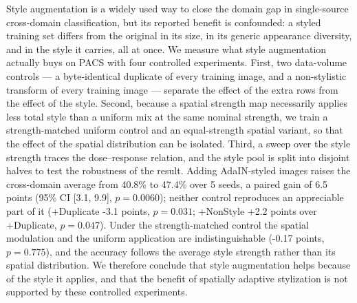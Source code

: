 Style augmentation is a widely used way to close the domain gap in single-source cross-domain classification, but its reported benefit is confounded: a styled training set differs from the original in its size, in its generic appearance diversity, and in the style it carries, all at once. We measure what style augmentation actually buys on PACS with four controlled experiments. First, two data-volume controls --- a byte-identical duplicate of every training image, and a non-stylistic transform of every training image --- separate the effect of the extra rows from the effect of the style. Second, because a spatial strength map necessarily applies less total style than a uniform mix at the same nominal strength, we train a strength-matched uniform control and an equal-strength spatial variant, so that the effect of the spatial distribution can be isolated. Third, a sweep over the style strength traces the dose--response relation, and the style pool is split into disjoint halves to test the robustness of the result. Adding AdaIN-styled images raises the cross-domain average from 40.8\% to 47.4\% over 5 seeds, a paired gain of 6.5 points (95\% CI [3.1, 9.9], $p=0.0060$); neither control reproduces an appreciable part of it (+Duplicate -3.1 points, $p=0.031$; +NonStyle +2.2 points over +Duplicate, $p=0.047$). Under the strength-matched control the spatial modulation and the uniform application are indistinguishable (-0.17 points, $p=0.775$), and the accuracy follows the average style strength rather than its spatial distribution. We therefore conclude that style augmentation helps because of the style it applies, and that the benefit of spatially adaptive stylization is not supported by these controlled experiments.
